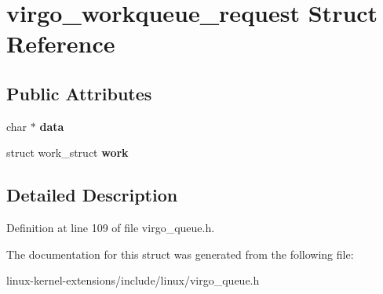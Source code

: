 \hypertarget{structvirgo__workqueue__request}{\section{virgo\-\_\-workqueue\-\_\-request Struct Reference}
\label{structvirgo__workqueue__request}
}
\subsection*{Public Attributes}
\begin{DoxyCompactItemize}
\item 
\hypertarget{structvirgo__workqueue__request_a7565d9e1e77825c1412465a73e8e90e5}{char $\ast$ {\bfseries data}}\label{structvirgo__workqueue__request_a7565d9e1e77825c1412465a73e8e90e5}

\item 
\hypertarget{structvirgo__workqueue__request_ac6b0763b165e4391313e81b2da14d079}{struct work\-\_\-struct {\bfseries work}}\label{structvirgo__workqueue__request_ac6b0763b165e4391313e81b2da14d079}

\end{DoxyCompactItemize}


\subsection{Detailed Description}


Definition at line 109 of file virgo\-\_\-queue.\-h.



The documentation for this struct was generated from the following file\-:\begin{DoxyCompactItemize}
\item 
linux-\/kernel-\/extensions/include/linux/virgo\-\_\-queue.\-h\end{DoxyCompactItemize}
